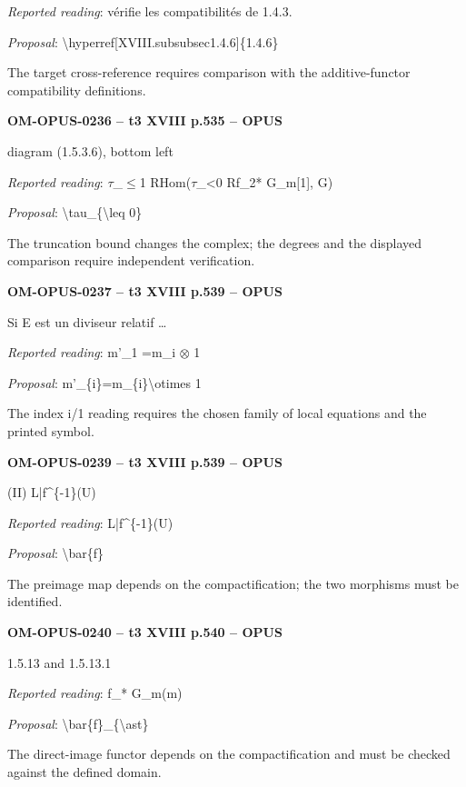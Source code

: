 \emph{Reported reading}: vérifie les compatibilités de 1.4.3.\par
\emph{Proposal}: \textbackslash{}hyperref[XVIII.subsubsec1.4.6]\{1.4.6\}\par
The target cross-reference requires comparison with the additive-functor compatibility definitions.\par
\par\noindent\textbf{OM-OPUS-0236 -- t3 XVIII p.535 -- OPUS}\par
diagram (1.5.3.6), bottom left\par
\emph{Reported reading}: \ensuremath{\tau}\_\ensuremath{\leq}1 RHom(\ensuremath{\tau}\_<0 Rf\_2* G\_m[1], G)\par
\emph{Proposal}: \textbackslash{}tau\_\{\textbackslash{}leq 0\}\par
The truncation bound changes the complex; the degrees and the displayed comparison require independent verification.\par
\par\noindent\textbf{OM-OPUS-0237 -- t3 XVIII p.539 -- OPUS}\par
Si E est un diviseur relatif …\par
\emph{Reported reading}: m'\_1 =\allowbreak  m\_i \ensuremath{\otimes} 1\par
\emph{Proposal}: m'\_\{i\}=\allowbreak m\_\{i\}\textbackslash{}otimes 1\par
The index i/1 reading requires the chosen family of local equations and the printed symbol.\par
\par\noindent\textbf{OM-OPUS-0239 -- t3 XVIII p.539 -- OPUS}\par
(II) L|f\textasciicircum{}\{-1\}(U)\par
\emph{Reported reading}: L|f\textasciicircum{}\{-1\}(U)\par
\emph{Proposal}: \textbackslash{}bar\{f\}\par
The preimage map depends on the compactification; the two morphisms must be identified.\par
\par\noindent\textbf{OM-OPUS-0240 -- t3 XVIII p.540 -- OPUS}\par
1.5.13 and 1.5.13.1\par
\emph{Reported reading}: f\_* G\_m(m)\par
\emph{Proposal}: \textbackslash{}bar\{f\}\_\{\textbackslash{}ast\}\par
The direct-image functor depends on the compactification and must be checked against the defined domain.\par
